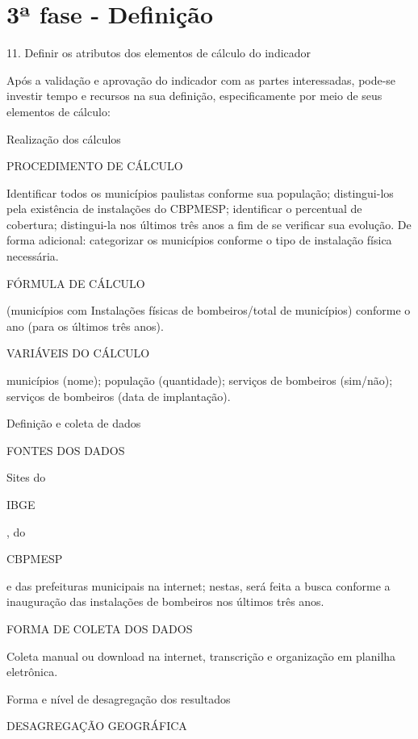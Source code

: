 \documentclass[
  letterpaper,
  DIV=11,
  numbers=noendperiod]{scrreprt}
\begin{document}

\hypertarget{uxaa-fase---definiuxe7uxe3o-1}{%
\section*{3ª fase - Definição}\label{uxaa-fase---definiuxe7uxe3o-1}}


11. Definir os atributos dos elementos de cálculo do indicador

Após a validação e aprovação do indicador com as partes interessadas,
pode-se investir tempo e recursos na sua definição, especificamente por
meio de seus elementos de cálculo:

Realização dos cálculos

PROCEDIMENTO DE CÁLCULO

Identificar todos os municípios paulistas conforme sua população;
distingui-los pela existência de instalações do CBPMESP; identificar o
percentual de cobertura; distingui-la nos últimos três anos a fim de se
verificar sua evolução. De forma adicional: categorizar os municípios
conforme o tipo de instalação física necessária.

FÓRMULA DE CÁLCULO

(municípios com Instalações físicas de bombeiros/total de municípios)
conforme o ano (para os últimos três anos).

VARIÁVEIS DO CÁLCULO

municípios (nome); população (quantidade); serviços de bombeiros
(sim/não); serviços de bombeiros (data de implantação).

Definição e coleta de dados

FONTES DOS DADOS

Sites do

IBGE

, do

CBPMESP

e das prefeituras municipais na internet; nestas, será feita a busca
conforme a inauguração das instalações de bombeiros nos últimos três
anos.

FORMA DE COLETA DOS DADOS

Coleta manual ou download na internet, transcrição e organização em
planilha eletrônica.

Forma e nível de desagregação dos resultados

DESAGREGAÇÃO GEOGRÁFICA
\end{document}
